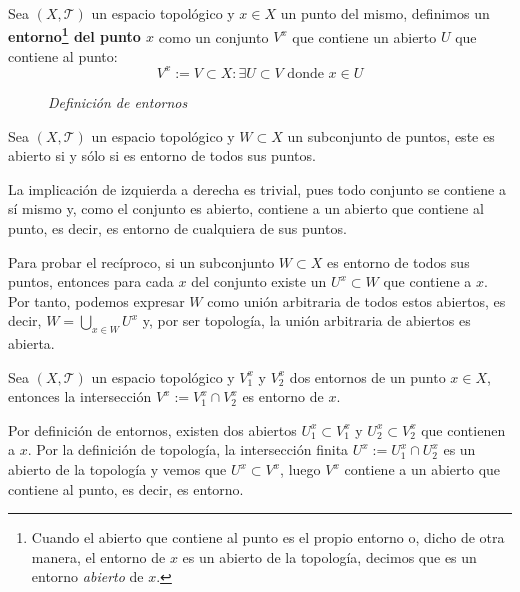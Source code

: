 \begin{defi}[Entorno]
Sea $(X, \mathcal{T})$ un espacio topológico y $x\in X$ un punto del mismo, definimos un \textbf{entorno\footnote{Cuando el abierto que contiene al punto es el propio entorno o, dicho de otra manera, el entorno de $x$ es un abierto de la topología, decimos que es un entorno \textit{abierto} de $x$.} del punto $x$} como un conjunto $V^x$ que contiene un abierto $U$ que contiene al punto:
\[
V^x := V\subset X : \exists U \subset V \text{ donde }x\in U
\]
\end{defi}

\begin{figure}[H]
    \centering
    \caption{\textit{Definición de entornos}}
    \label{fig:definición-entornos}
\end{figure}

\begin{prop}
Sea $(X, \mathcal{T})$ un espacio topológico y $W \subset X$ un subconjunto de puntos, este es abierto si y sólo si es entorno de todos sus puntos.
\end{prop}
\begin{demo}
La implicación de izquierda a derecha es trivial, pues todo conjunto se contiene a sí mismo y, como el conjunto es abierto, contiene a un abierto que contiene al punto, es decir, es entorno de cualquiera de sus puntos.

Para probar el recíproco, si un subconjunto $W\subset X$ es entorno de todos sus puntos, entonces para cada $x$ del conjunto existe un $U^x\subset W$ que contiene a $x$. Por tanto, podemos expresar $W$ como unión arbitraria de todos estos abiertos, es decir, $W = \bigcup_{x\in W} U^x$ y, por ser topología, la unión arbitraria de abiertos es abierta.
\end{demo}

\begin{prop}
Sea $(X,\mathcal{T})$ un espacio topológico y $V_1^x$ y $V_2^x$ dos entornos de un punto $x\in X$, entonces la intersección $V^x := V_1^x\cap V_2^x$ es entorno de $x$.
\end{prop}
\begin{demo}
Por definición de entornos, existen dos abiertos $U_1^x\subset V_1^x$ y $U_2^x\subset V_2^x$ que contienen a $x$. Por la definición de topología, la intersección finita $U^x := U_1^x\cap U_2^x$ es un abierto de la topología y vemos que $U^x \subset V^x$, luego $V^x$ contiene a un abierto que contiene al punto, es decir, es entorno.
\end{demo}


